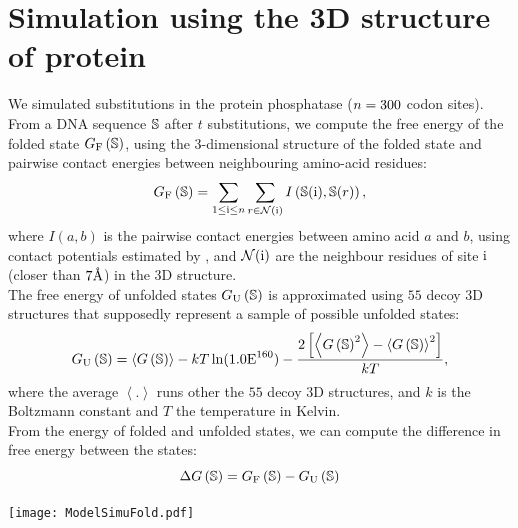 \section{Simulation using the 3D structure of protein}
\label{sec:simulation-using-the-3d-structure-of-protein}

We simulated substitutions in the protein phosphatase ($n=300$ codon sites).
From a \acrshort{DNA} sequence $\mathbb{S}$ after $t$ substitutions, we compute the free energy of the folded state $G_{\text{F}} \left(\mathbb{S}\right)$, using the 3-dimensional structure of the folded state and pairwise contact energies between neighbouring amino-acid residues:
\begin{equation}
    G_{\text{F}} \left(\mathbb{S}\right) = \sum\limits_{1 \leq \text{i} \leq n} \sum\limits_{r \in \mathcal{N}(\text{i})} I \left(\mathbb{S}(\text{i}), \mathbb{S}(r) \right),
\end{equation}
where $I(a,b)$ is the pairwise contact energies between amino acid $a$ and $b$, using contact potentials estimated by \citet{Miyazawa1985}, and $\mathcal{N}(\text{i})$ are the neighbour residues of site $\text{i}$ (closer than $7\text{\normalfont\AA}$) in the 3D structure.\\
The free energy of unfolded states $G_{\text{U}} \left(\mathbb{S}\right)$ is approximated using $55$ decoy 3D structures that supposedly represent a sample of possible unfolded states:
\begin{equation}
    G_{\text{U}} \left(\mathbb{S}\right) = \left\langle G\left(\mathbb{S}\right) \right\rangle - kT \ln (1.0\text{E}^{160}) - \frac{2 \left[ \left\langle G\left(\mathbb{S}\right)^2 \right\rangle - \left\langle G\left(\mathbb{S}\right) \right\rangle^2\right] }{kT},
\end{equation}
where the average $\left\langle . \right\rangle$ runs other the $55$ decoy 3D structures, and $k$ is the Boltzmann constant and $T$ the temperature in Kelvin.\\
From the energy of folded and unfolded states, we can compute the difference in free energy between the states:
\begin{equation}
    \Delta G\left(\mathbb{S}\right) = G_{\text{F}} \left(\mathbb{S}\right) - G_{\text{U}} \left(\mathbb{S}\right)
\end{equation}
\begin{center}
    \texttt{[image: ModelSimuFold.pdf]}
\end{center}

